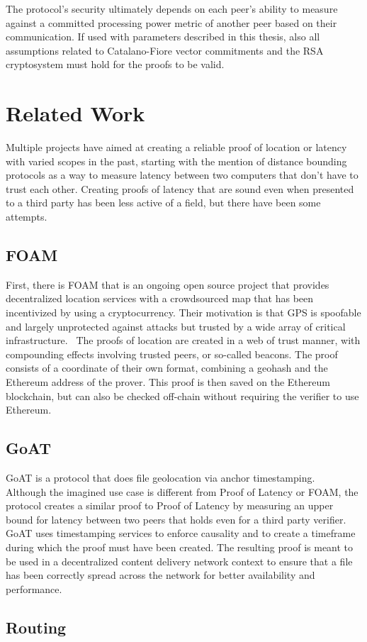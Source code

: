 The protocol's security ultimately depends on each peer's ability to measure against a committed processing power metric of another peer based on their communication. If used with parameters described in this thesis, also all assumptions related to Catalano-Fiore vector commitments and the RSA cryptosystem must hold for the proofs to be valid.

\section{Related Work}
Multiple projects have aimed at creating a reliable proof of location or latency with varied scopes in the past, starting with the mention of distance bounding protocols as a way to measure latency between two computers that don't have to trust each other. Creating proofs of latency that are sound even when presented to a third party has been less active of a field, but there have been some attempts.

\subsection{FOAM}
First, there is FOAM that is an ongoing open source project that provides decentralized location services with a crowdsourced map that has been incentivized by using a cryptocurrency. Their motivation is that GPS is spoofable and largely unprotected against attacks but trusted by a wide array of critical infrastructure.~\cite{Foamspace_Corp2018-me} The proofs of location are created in a web of trust manner, with compounding effects involving trusted peers, or so-called beacons. The proof consists of a coordinate of their own format, combining a geohash and the Ethereum address of the prover. This proof is then saved on the Ethereum blockchain, but can also be checked off-chain without requiring the verifier to use Ethereum.

\subsection{GoAT}
GoAT is a protocol that does file geolocation via anchor timestamping.~\cite{Maram_undated-it} Although the imagined use case is different from Proof of Latency or FOAM, the protocol creates a similar proof to Proof of Latency by measuring an upper bound for latency between two peers that holds even for a third party verifier. GoAT uses timestamping services to enforce causality and to create a timeframe during which the proof must have been created. The resulting proof is meant to be used in a decentralized content delivery network context to ensure that a file has been correctly spread across the network for better availability and performance.

\subsection{Routing}
